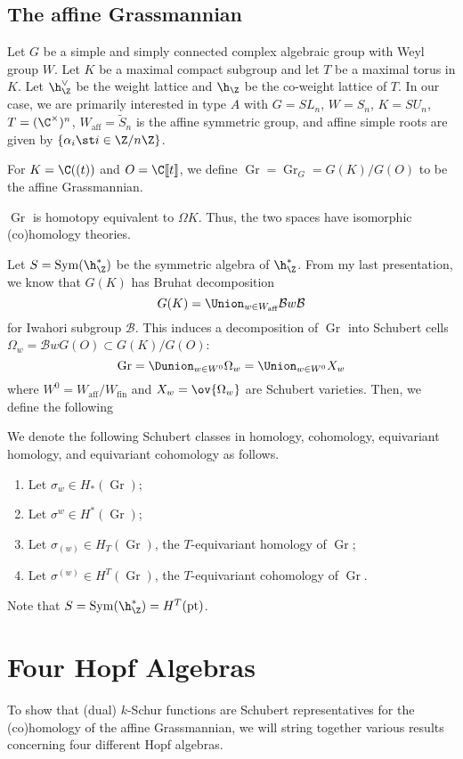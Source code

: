 \documentclass[11pt,leqno,oneside]{amsart}
\numberwithin{thm}{section}
\renewcommand{\W}{W}
\newcommand{\Waff}{\W_{\text{aff}}}
\newcommand{\eS}{\tilde{S}}
\newcommand{\Gr}{\operatorname{Gr}}
\newcommand{\Bc}{\mathcal{B}}
\begin{document}
\subsection{The affine Grassmannian}
Let \(G\) be a simple and simply connected complex algebraic group
with Weyl group \(\W\). Let \(K\) be a maximal compact subgroup and
let \(T\) be a maximal torus in \(K\). Let \(\h_\Z^\vee\) be the
weight lattice and \(\h_\Z\) be the co-weight lattice of \(T\). In our
case, we are primarily interested in type \(A\) with \(G = SL_n\), \(\W = S_n\), \(K =
SU_n\), \(T = (\C^\times)^n\), \(\Waff = \eS_n\) is the affine symmetric group, and
affine simple roots are given by \(\{\alpha_i \st i \in \Z/n\Z\}\).

For \(K = \C((t))\) and \(O = \C \llbracket t \rrbracket\), we define
\(\Gr = \Gr_G = G(K)/G(O)\) to be the affine Grassmannian.
\begin{prop}
 \(\Gr\) is homotopy equivalent to \(\Omega K\). Thus, the two spaces
 have isomorphic (co)homology theories.
\end{prop}
Let \(S = \operatorname{Sym}(\h_\Z^*)\) be the
symmetric algebra of \(\h^*_\Z\). From my last presentation, we know
that \(G(K)\) has Bruhat decomposition \[
  G(K) = \Union_{w \in \Waff} \Bc w \Bc
\]
for Iwahori subgroup \(\Bc\). This induces a decomposition of \(\Gr\)
into Schubert cells \(\Omega_w = \Bc w G(O) \subset G(K)/G(O)\): \[
  \Gr = \Dunion_{w \in \W^0} \Omega_w = \Union_{w \in W^0} X_w
\]
where \(W^0 = \Waff/W_{\text{fin}}\) and \(X_w = \ov{\Omega_w}\) are
Schubert varieties. Then, we define the following
\begin{defn}
  We denote the following Schubert classes in homology, cohomology,
  equivariant homology, and equivariant cohomology as follows.
  \begin{enumerate}
  \item Let \(\sigma_w \in H_*(\Gr)\);
  \item Let \(\sigma^w \in H^*(\Gr)\);
  \item Let \(\sigma_{(w)} \in H_T(\Gr)\), the \(T\)-equivariant
    homology of \(\Gr\);
  \item Let \(\sigma^{(w)} \in H^T(\Gr)\), the \(T\)-equivariant
    cohomology of \(\Gr\).
  \end{enumerate}
\end{defn}
\begin{rmk}
  Note that \(S = \operatorname{Sym}(\h_\Z^*) = H^T(\text{pt})\).
\end{rmk}
\section{Four Hopf Algebras}
To show that (dual) \(k\)-Schur functions are Schubert representatives for
the (co)homology of the affine Grassmannian, we will string together
various results concerning four different Hopf algebras.
\end{document}
